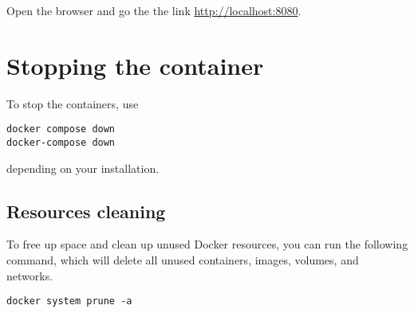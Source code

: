 Open the browser and go the the link \url{http://localhost:8080}.

\section{Stopping the container}

To stop the containers, use

\begin{center}
\verb|docker compose down| \\
\verb|docker-compose down|
\end{center}

depending on your installation.

\subsection{Resources cleaning}

To free up space and clean up unused Docker resources, you can run the following command, which will delete all unused containers, images, volumes, and networks.

\begin{center}
\verb|docker system prune -a|
\end{center}


